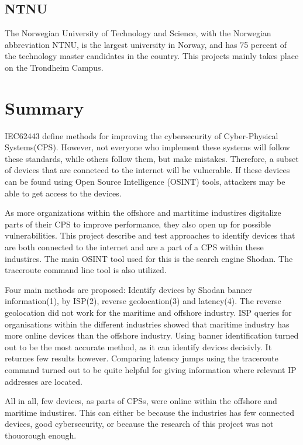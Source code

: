 \subsection*{NTNU}\label{sec:ntnu}
The Norwegian University of Technology and Science, with the Norwegian abbreviation NTNU, is the largest university in Norway, and has 75 percent of the technology master candidates in the country. This projects mainly takes place on the Trondheim Campus.

\section*{Summary}
IEC62443 define methods for improving the cybersecurity of Cyber-Physical Systems(CPS). However, not everyone who implement these systems will follow these standards, while others follow them, but make mistakes. Therefore, a subset of devices that are connetced to the internet will be vulnerable. If these devices can be found using Open Source Intelligence (OSINT) tools, attackers may be able to get access to the devices. 

As more organizations within the offshore and martitime industires digitalize parts of their CPS to improve performance, they also open up for possible vulnerabilities. This project describe and test approaches to identify devices that are both connected to the internet and are a part of a CPS within these industires. The main OSINT tool used for this is the search engine Shodan. The traceroute command line tool is also utilized.

Four main methods are proposed: Identify devices by Shodan banner information(1), by ISP(2), reverse geolocation(3) and latency(4).
The reverse geolocation did not work for the maritime and offshore industry. 
ISP queries for organisations within the different industries showed that  maritime industry has more online devices than the offshore industry. 
Using banner identification turned out to be the most accurate method, as it can identify devices decisivly. It returnes few results however.
Comparing latency jumps using the traceroute command turned out to be quite helpful for giving information where relevant IP addresses are located.

All in all, few devices, as parts of CPSs, were online within the offshore and maritime industires. This can either be because the industries has few connected devices, good cybersecurity, or because the research of this project was not thouorough enough.

\newpage
